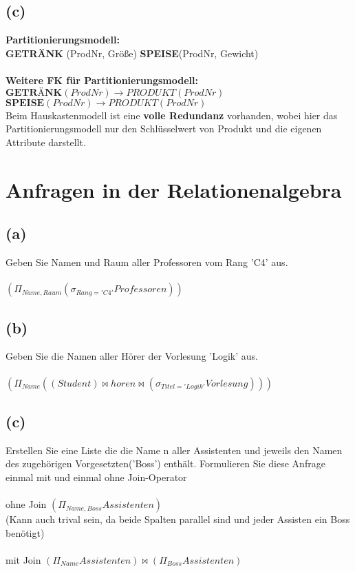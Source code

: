 \documentclass{article}
\begin{document}
\subsection{(c)}
\textbf{Partitionierungsmodell:} \\
\textbf{GETRÄNK} (ProdNr, Größe)
\textbf{SPEISE}(ProdNr, Gewicht)\\ \\
\textbf{Weitere FK für Partitionierungsmodell:}\\
$\textbf{GETRÄNK}(ProdNr) \rightarrow PRODUKT(ProdNr)$\\
$\textbf{SPEISE}(ProdNr) \rightarrow PRODUKT(ProdNr)$\\
Beim Hauskastenmodell ist eine \textbf{volle Redundanz} vorhanden, wobei hier das Partitionierungsmodell nur den Schlüsselwert von Produkt und die eigenen Attribute darstellt.


\newpage
\section{Anfragen in der Relationenalgebra}
\subsection{(a)}
Geben Sie Namen und Raum aller Professoren vom Rang 'C4' aus.\\\\
$(\Pi_{Name,Raum}(\sigma_{Rang='C4'} Professoren))$ \\

\subsection{(b)}
Geben Sie die Namen aller Hörer der Vorlesung 'Logik' aus. \\\\
$(\Pi_{Name}((Student) \bowtie horen \bowtie (\sigma_{Titel='Logik'}Vorlesung)))$ \\

\subsection{(c)}
Erstellen Sie eine Liste die die Name n aller Assistenten und jeweils den
Namen des zugehörigen Vorgesetzten('Boss') enthält. Formulieren Sie diese Anfrage einmal mit und einmal 
ohne Join-Operator\\\\
ohne Join $(\Pi_{Name, Boss} Assistenten)$\\
(Kann auch trival sein, da beide Spalten parallel sind und jeder Assisten ein Boss benötigt)\\\\
mit Join $(\Pi_{Name} Assistenten) \bowtie (\Pi_{Boss} Assistenten)$
\end{document}
